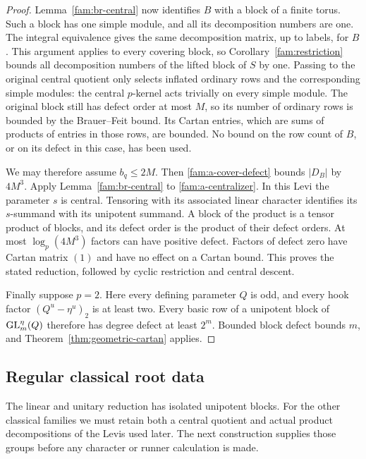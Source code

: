 \begin{proof}
Lemma~\ref{fam:br-central} now identifies \(B\) with a block of a
finite torus.  Such a block has one simple module, and all its
decomposition numbers are one.  The integral equivalence gives the
same decomposition matrix, up to labels, for \(B\).  This argument
applies to every covering block, so Corollary~\ref{fam:restriction}
bounds all decomposition numbers of the lifted block of \(S\) by
one.  Passing to the original central quotient only selects inflated
ordinary rows and the corresponding simple modules: the central
\(p\)-kernel acts trivially on every simple module.  The original
block still has defect order at most \(M\), so its number of ordinary
rows is bounded by the Brauer--Feit bound.  Its Cartan entries, which
are sums of products of entries in those rows, are bounded.  No
bound on the row count of \(B\), or on its defect in this case, has
been used.

We may therefore assume \(b_q\leq2M\).  Then
\eqref{fam:a-cover-defect} bounds \(|D_B|\) by \(4M^3\).
Apply Lemma~\ref{fam:br-central} to
\eqref{fam:a-centralizer}.  In this Levi the parameter \(s\) is
central.  Tensoring with its associated linear character identifies
its \(s\)-summand with its unipotent summand.  A block of the product
is a tensor product of blocks, and its defect order is the product
of their defect orders.  At most \(\log_p(4M^3)\) factors can have
positive defect.  Factors of defect zero have Cartan matrix \((1)\)
and have no effect on a Cartan bound.  This proves the stated
reduction, followed by cyclic restriction and central descent.

Finally suppose \(p=2\).  Here every defining parameter \(Q\) is
odd, and every hook factor \((Q^u-\eta^u)_2\) is at least two.
Every basic row of a unipotent block of \(\operatorname{GL}_m^\eta(Q)\) therefore
has degree defect at least \(2^m\).  Bounded block defect bounds
\(m\), and Theorem~\ref{thm:geometric-cartan} applies.
\end{proof}

\subsection{Regular classical root data}

The linear and unitary reduction has isolated unipotent blocks.
For the other classical families we must retain both a central
quotient and actual product decompositions of the Levis used
later.  The next construction supplies those groups before any
character or runner calculation is made.

